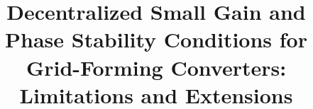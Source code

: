 \documentclass{IEEEtran4PSCC}
\begin{document}
%
\title{Decentralized Small Gain and Phase Stability Conditions for Grid-Forming Converters: Limitations and Extensions}



\author{
\IEEEauthorblockA{AIT Austrian Institute of Technology,
Vienna, Austria
}}




\maketitle
\end{document}
